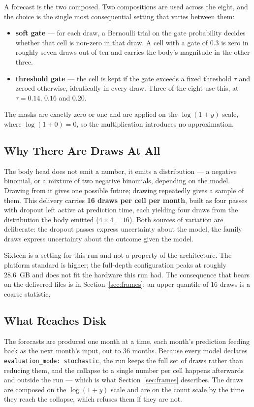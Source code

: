 A forecast is the two composed. Two compositions are used across the eight, and the choice is the
single most consequential setting that varies between them:

\begin{itemize}
    \item \textbf{soft gate} --- for each draw, a Bernoulli trial on the gate probability decides
          whether that cell is non-zero in that draw. A cell with a gate of $0.3$ is zero in
          roughly seven draws out of ten and carries the body's magnitude in the other three.
    \item \textbf{threshold gate} --- the cell is kept if the gate exceeds a fixed threshold
          $\tau$ and zeroed otherwise, identically in every draw. Three of the eight use this,
          at $\tau = 0.14$, $0.16$ and $0.20$.
\end{itemize}

\noindent The masks are exactly zero or one and are applied on the $\log(1+y)$ scale, where
$\log(1+0) = 0$, so the multiplication introduces no approximation.

\subsection*{Why There Are Draws At All}

The body head does not emit a number, it emits a distribution --- a negative binomial, or a
mixture of two negative binomials, depending on the model. Drawing from it gives one possible
future; drawing repeatedly gives a sample of them. This delivery carries \textbf{16 draws per cell
per month}, built as four passes with dropout left active at prediction time, each yielding four
draws from the distribution the body emitted ($4 \times 4 = 16$). Both sources of variation are
deliberate: the dropout passes express uncertainty about the model, the family draws express
uncertainty about the outcome given the model.

Sixteen is a setting for this run and not a property of the architecture. The platform standard is
higher; the full-depth configuration peaks at roughly 28.6~GB and does not fit the hardware this
run had. The consequence that bears on the delivered files is in
Section~\ref{sec:frames}: an upper quantile of 16 draws is a coarse statistic.

\subsection*{What Reaches Disk}

The forecasts are produced one month at a time, each month's prediction feeding back as the next
month's input, out to 36 months. Because every model declares \texttt{evaluation\_mode:
stochastic}, the run keeps the full set of draws rather than reducing them, and the collapse to a
single number per cell happens afterwards and outside the run --- which is what
Section~\ref{sec:frames} describes. The draws are composed on the $\log(1+y)$ scale and are on the
count scale by the time they reach the collapse, which refuses them if they are not.
